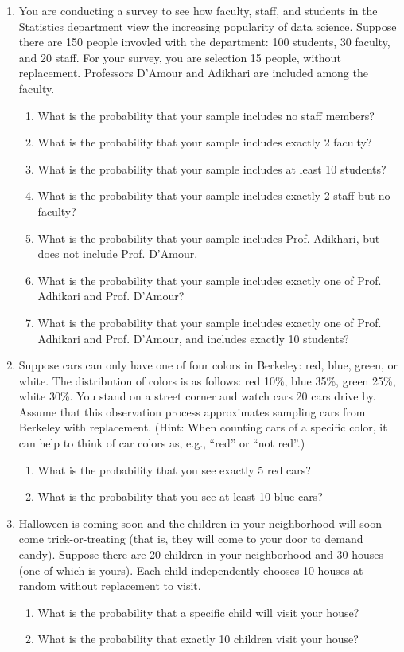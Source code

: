 \documentclass[11pt]{article}
\begin{document}
\begin{enumerate}
    \item You are conducting a survey to see how faculty, staff, and students in the Statistics department view the increasing popularity of data science. Suppose there are 150 people invovled with the department: 100 students, 30 faculty, and 20 staff. For your survey, you are selection 15 people, without replacement. Professors D'Amour and Adikhari are included among the faculty.
        \begin{enumerate}
            \item What is the probability that your sample includes no staff members?
            \item What is the probability that your sample includes exactly 2 faculty?
            \item What is the probability that your sample includes at least 10 students?
            \item What is the probability that your sample includes exactly 2 staff but no faculty?
            \item What is the probability that your sample includes Prof. Adikhari, but does not include Prof. D'Amour.
            \item What is the probability that your sample includes exactly one of Prof. Adhikari and Prof. D'Amour?
            \item What is the probability that your sample includes exactly one of Prof. Adhikari and Prof. D'Amour, and includes exactly 10 students?
        \end{enumerate}

    \item Suppose cars can only have one of four colors in Berkeley: red, blue, green, or white. The distribution of colors is as follows: red 10\%, blue 35\%, green 25\%, white 30\%. You stand on a street corner and watch cars 20 cars drive by. Assume that this observation process approximates sampling cars from Berkeley with replacement. (Hint: When counting cars of a specific color, it can help to think of car colors as, e.g., ``red'' or ``not red''.)
        \begin{enumerate}
            \item What is the probability that you see exactly 5 red cars?
            \item What is the probability that you see at least 10 blue cars?
        \end{enumerate}

    \item Halloween is coming soon and the children in your neighborhood will soon come trick-or-treating (that is, they will come to your door to demand candy). Suppose there are 20 children in your neighborhood and 30 houses (one of which is yours). Each child independently chooses 10 houses at random without replacement to visit.
        \begin{enumerate}
            \item What is the probability that a specific child will visit your house?
            \item What is the probability that exactly 10 children visit your house?
        \end{enumerate}


\end{enumerate}
\end{document}
